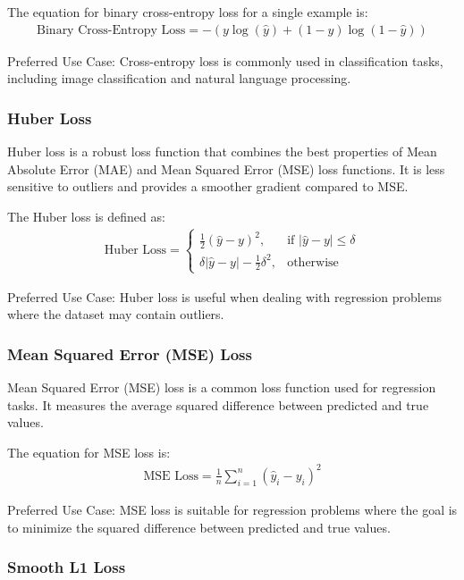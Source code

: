 The equation for binary cross-entropy loss for a single example is:
\begin{align}
	\text{Binary Cross-Entropy Loss} = -\left(y \log(\hat{y}) + (1 - y) \log(1 - \hat{y})\right)
\end{align}

Preferred Use Case: Cross-entropy loss is commonly used in classification tasks, including image classification and natural language processing.

\subsubsection{Huber Loss}

Huber loss is a robust loss function that combines the best properties of Mean Absolute Error (MAE) and Mean Squared Error (MSE) loss functions. It is less sensitive to outliers and provides a smoother gradient compared to MSE.

The Huber loss is defined as:
\begin{align}
	\text{Huber Loss} = \begin{cases}
		\frac{1}{2}(\hat{y} - y)^2, & \text{if } |\hat{y} - y| \leq \delta \\
		\delta|\hat{y} - y| - \frac{1}{2}\delta^2, & \text{otherwise}
	\end{cases}
\end{align}

Preferred Use Case: Huber loss is useful when dealing with regression problems where the dataset may contain outliers. \cite{huberloss}

\subsubsection{Mean Squared Error (MSE) Loss}

Mean Squared Error (MSE) loss is a common loss function used for regression tasks. It measures the average squared difference between predicted and true values.

The equation for MSE loss is:
\begin{align}
	\text{MSE Loss} = \frac{1}{n} \sum_{i=1}^{n} (\hat{y}_i - y_i)^2    
\end{align}

Preferred Use Case: MSE loss is suitable for regression problems where the goal is to minimize the squared difference between predicted and true values.

\subsubsection{Smooth L1 Loss}


